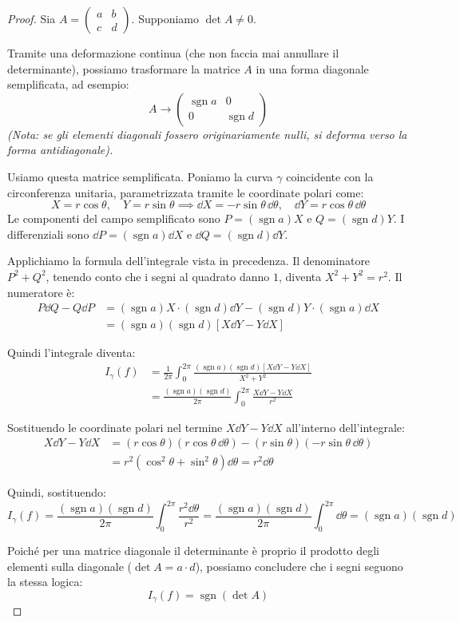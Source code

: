 \documentclass[openany]{book}
\theoremstyle{definition}
\theoremstyle{remark}
\DeclareMathOperator{\sgn}{sgn}
\begin{document}
\begin{proof}
Sia $A = \begin{pmatrix} a & b \\ c & d \end{pmatrix}$. Supponiamo $\det A \neq 0$. 

Tramite una deformazione continua (che non faccia mai annullare il determinante), possiamo trasformare la matrice $A$ in una forma diagonale semplificata, ad esempio:
\[
A \to \begin{pmatrix} \sgn a & 0 \\ 0 & \sgn d \end{pmatrix}
\]
\textit{(Nota: se gli elementi diagonali fossero originariamente nulli, si deforma verso la forma antidiagonale).}

Usiamo questa matrice semplificata. Poniamo la curva $\gamma$ coincidente con la circonferenza unitaria, parametrizzata tramite le coordinate polari come:
\[
X = r \cos\theta, \quad Y = r \sin\theta \implies \dd X = -r \sin\theta \, \dd\theta, \quad \dd Y = r \cos\theta \, \dd\theta
\]
Le componenti del campo semplificato sono $P = (\sgn a)X$ e $Q = (\sgn d)Y$.
I differenziali sono $\dd P = (\sgn a)\dd X$ e $\dd Q = (\sgn d)\dd Y$.

Applichiamo la formula dell'integrale vista in precedenza. Il denominatore $P^2 + Q^2$, tenendo conto che i segni al quadrato danno $1$, diventa $X^2 + Y^2 = r^2$. Il numeratore è:
\begin{align*}
P \dd Q - Q \dd P &= (\sgn a)X \cdot (\sgn d)\dd Y - (\sgn d)Y \cdot (\sgn a)\dd X \\
&= (\sgn a)(\sgn d) [X \dd Y - Y \dd X]
\end{align*}

Quindi l'integrale diventa:
\begin{align*}
I_\gamma(f) &= \frac{1}{2\pi} \int_0^{2\pi} \frac{(\sgn a)(\sgn d)[X \dd Y - Y \dd X]}{X^2 + Y^2} \\
&= \frac{(\sgn a)(\sgn d)}{2\pi} \int_0^{2\pi} \frac{X \dd Y - Y \dd X}{r^2}
\end{align*}

Sostituendo le coordinate polari nel termine $X \dd Y - Y \dd X$ all'interno dell'integrale:
\begin{align*}
X \dd Y - Y \dd X &= (r \cos\theta)(r \cos\theta \, \dd\theta) - (r \sin\theta)(-r \sin\theta \, \dd\theta) \\
&= r^2 (\cos^2\theta + \sin^2\theta) \dd\theta = r^2 \dd\theta
\end{align*}

Quindi, sostituendo:
\[
I_\gamma(f) = \frac{(\sgn a)(\sgn d)}{2\pi} \int_0^{2\pi} \frac{r^2 \dd\theta}{r^2} = \frac{(\sgn a)(\sgn d)}{2\pi} \int_0^{2\pi} \dd\theta = (\sgn a)(\sgn d)
\]

Poiché per una matrice diagonale il determinante è proprio il prodotto degli elementi sulla diagonale ($\det A = a \cdot d$), possiamo concludere che i segni seguono la stessa logica:
\[
I_\gamma(f) = \sgn(\det A)
\]
\end{proof}
\end{document}
